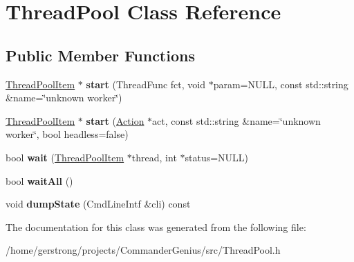 \hypertarget{class_thread_pool}{
\section{ThreadPool Class Reference}
\label{class_thread_pool}
}
\subsection*{Public Member Functions}
\begin{DoxyCompactItemize}
\item 
\hypertarget{class_thread_pool_a08b13e066e0a8d00b5004df235a4111a}{
\hyperlink{struct_thread_pool_item}{ThreadPoolItem} $\ast$ {\bfseries start} (ThreadFunc fct, void $\ast$param=NULL, const std::string \&name=\char`\"{}unknown worker\char`\"{})}
\label{class_thread_pool_a08b13e066e0a8d00b5004df235a4111a}

\item 
\hypertarget{class_thread_pool_ae216465b38bfe1a20921cd716cc25874}{
\hyperlink{struct_thread_pool_item}{ThreadPoolItem} $\ast$ {\bfseries start} (\hyperlink{struct_action}{Action} $\ast$act, const std::string \&name=\char`\"{}unknown worker\char`\"{}, bool headless=false)}
\label{class_thread_pool_ae216465b38bfe1a20921cd716cc25874}

\item 
\hypertarget{class_thread_pool_ac3f0426c0e2f8242367d066c8081b8f9}{
bool {\bfseries wait} (\hyperlink{struct_thread_pool_item}{ThreadPoolItem} $\ast$thread, int $\ast$status=NULL)}
\label{class_thread_pool_ac3f0426c0e2f8242367d066c8081b8f9}

\item 
\hypertarget{class_thread_pool_ad8005dd7ae5b4ec3299da2ea8545e159}{
bool {\bfseries waitAll} ()}
\label{class_thread_pool_ad8005dd7ae5b4ec3299da2ea8545e159}

\item 
\hypertarget{class_thread_pool_ad6c00cec5cb35931d8c27c1aef9cada2}{
void {\bfseries dumpState} (CmdLineIntf \&cli) const }
\label{class_thread_pool_ad6c00cec5cb35931d8c27c1aef9cada2}

\end{DoxyCompactItemize}


The documentation for this class was generated from the following file:\begin{DoxyCompactItemize}
\item 
/home/gerstrong/projects/CommanderGenius/src/ThreadPool.h\end{DoxyCompactItemize}
